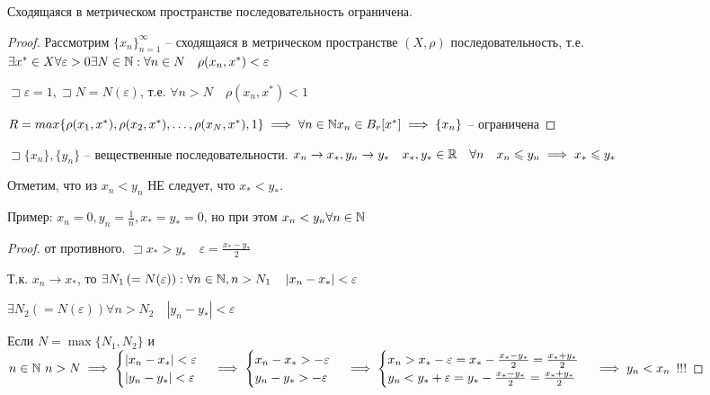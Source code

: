     \begin{theorem}
        Сходящаяся в метрическом пространстве последовательность ограничена.
    \end{theorem}
    \begin{proof}
        Рассмотрим $\{x_n\}_{n=1}^{\infty }$ -- сходящаяся в метрическом пространстве $(X,\rho)$ последовательность, т.е. $\exists x^*\in X\forall \varepsilon>0 \exists N\in \mathbb{N} :\forall n\in N \quad\rho( x_n,x^*)<\varepsilon$

        $\sqsupset \varepsilon = 1, \sqsupset N = N(\varepsilon)$, т.е. $\forall n>N\quad \rho(x_n, x^*)<1$

        $R = max\{\rho(x_1, x^*), \rho(x_2, x^*), \ldots, \rho(x_N, x^*), 1\} \implies \forall n\in \mathbb{N}  x_{n} \in B_r[x^*] \implies \{x_n\}$ -- ограничена
    \end{proof}

    \begin{theorem}

        $\sqsupset \{x_{n} \}, \{y_{n} \}$ -- вещественные последовательности. $x_n\to x_*, y_n\to y_*\quad x_*, y_*\in \mathbb{R}\quad \forall n\quad x_{n} \leqslant y_{n} \implies  x_*\leqslant y_*$

        Отметим, что из $x_{n} <y_{n} $ НЕ следует, что $x_*<y_*$.

        Пример: $x_{n} =0, y_{n}  = \frac{1}{n}, x_* = y_* =  0$, но при этом $x_n<y_n \forall n\in \mathbb{N} $
    \end{theorem}
    \begin{proof}
        от противного. $\sqsupset  x_*>y_*\quad \varepsilon = \frac{x_*-y_*}{2}$

        Т.к. $x_{n} \to x_*$, то $\exists N_1\left( =N(\varepsilon) \right): \forall n\in \mathbb{N} , n>N_1\quad \left| x_n-x_* \right| <\varepsilon $

        $\exists N_2\left( =N(\varepsilon) \right) \forall n>N_2\quad \left| y_n-y_* \right| <\varepsilon$

        Если $N = \max\{N_1, N_2\}$ и $n\in \mathbb{N} ~n>N \implies \begin{cases}
            \left| x_n-x_* \right| <\varepsilon\\
            \left| y_n-y_* \right| <\varepsilon\\
        \end{cases} \implies \begin{cases}
            x_n-x_* >-\varepsilon\\
            y_n-y_* >-\varepsilon\\
        \end{cases} \implies \begin{cases}
            x_n>x_*-\varepsilon = x_* - \frac{x_*-y_*}{2} = \frac{x_*+y_*}{2}\\
            y_n<y_*+\varepsilon = y_* - \frac{x_*-y_*}{2} = \frac{x_*+y_*}{2}\\
        \end{cases} \implies  y_n<x_n$ !!!
    \end{proof}

